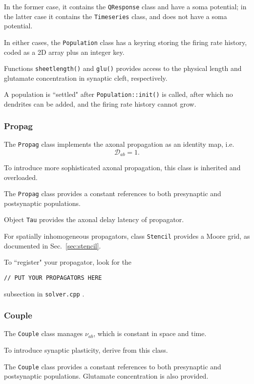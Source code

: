 \documentclass[12pt,a4paper]{article}
\newcommand{\type}[1]{{\small\small\tt #1} }
\begin{document}
In the former case, it contains the \type{QResponse} class and have a soma potential; in the latter case it contains the \type{Timeseries} class, and does not have a soma potential.

In either cases, the \type{Population} class has a keyring storing the firing rate history, coded as a 2D array plus an integer key.

Functions \type{sheetlength()} and \type{glu()} provides access to the physical length and glutamate concentration in synaptic cleft, respectively.

A population is ``settled" after \type{Population::init()} is called, after which no dendrites can be added, and the firing rate history cannot grow.

\subsubsection{Propag}
\label{sec:propag}

The \type{Propag} class implements the axonal propagation as an identity map, i.e.
\[ \mathcal{D}_{ab} = 1. \]

To introduce more sophisticated axonal propagation, this class is inherited and overloaded.

The \type{Propag} class provides a constant references to both presynaptic and postsynaptic populations.

Object \type{Tau} provides the axonal delay latency of propagator.

For spatially inhomogeneous propagators, class \type{Stencil} provides a Moore grid, as documented in Sec.~\ref{sec:stencil}.

To ``register" your propagator, look for the
\begin{lstlisting}
// PUT YOUR PROPAGATORS HERE
\end{lstlisting}
subsection in \type{solver.cpp}.

\subsubsection{Couple}
\label{sec:couple}

The \type{Couple} class manages \(\nu_{ab}\), which is constant in space and time.

To introduce synaptic plasticity, derive from this class.

The \type{Couple} class provides a constant references to both presynaptic and postsynaptic populations. Glutamate concentration is also provided.
\end{document}
